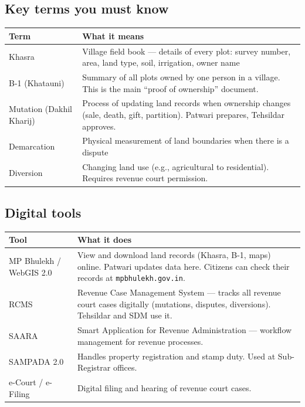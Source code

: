 \documentclass[11pt,a4paper]{article}
\begin{document}
\subsection{Key terms you must know}

\begin{tabularx}{\textwidth}{@{}L{3cm} X@{}}
\toprule
\textbf{Term} & \textbf{What it means} \\
\midrule
Khasra & Village field book --- details of every plot: survey number, area, land type, soil, irrigation, owner name \\
B-1 (Khatauni) & Summary of all plots owned by one person in a village. This is the main ``proof of ownership'' document. \\
Mutation (Dakhil Kharij) & Process of updating land records when ownership changes (sale, death, gift, partition). Patwari prepares, Tehsildar approves. \\
Demarcation & Physical measurement of land boundaries when there is a dispute \\
Diversion & Changing land use (e.g., agricultural to residential). Requires revenue court permission. \\
\bottomrule
\end{tabularx}

\subsection{Digital tools}

\begin{tabularx}{\textwidth}{@{}L{3.5cm} X@{}}
\toprule
\textbf{Tool} & \textbf{What it does} \\
\midrule
MP Bhulekh / WebGIS 2.0 & View and download land records (Khasra, B-1, maps) online. Patwari updates data here. Citizens can check their records at \texttt{mpbhulekh.gov.in}. \\
RCMS & Revenue Case Management System --- tracks all revenue court cases digitally (mutations, disputes, diversions). Tehsildar and SDM use it. \\
SAARA & Smart Application for Revenue Administration --- workflow management for revenue processes. \\
SAMPADA 2.0 & Handles property registration and stamp duty. Used at Sub-Registrar offices. \\
e-Court / e-Filing & Digital filing and hearing of revenue court cases. \\
\bottomrule
\end{tabularx}
\end{document}
